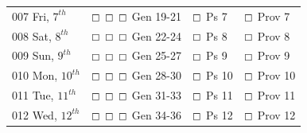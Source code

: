 \documentclass[10pt,landscape,twocolumn,letterpaper]{article}
\begin{document}
\begin{tabular}{p{0.8in}p{1.3in}p{1.2in}p{1.2in}}
\tiny 007 \normalsize Fri, $7^{th}$ & $\boxempty$ $\boxempty$ $\boxempty$ \hspace{.05in}  \textcolor[rgb]{1.00,0.00,0.00}{Gen 19-21} & $\boxempty$ \hspace{.05in} \textcolor[rgb]{0.00,1.00,0.00}{Ps 7} & $\boxempty$ \hspace{.05in} \textcolor[rgb]{0.00,0.00,1.00}{Prov 7}  \\

\tiny 008 \normalsize Sat, $8^{th}$ & $\boxempty$ $\boxempty$ $\boxempty$ \hspace{.05in}  \textcolor[rgb]{1.00,0.00,0.00}{Gen 22-24} & $\boxempty$ \hspace{.05in} \textcolor[rgb]{0.00,1.00,0.00}{Ps 8} & $\boxempty$ \hspace{.05in} \textcolor[rgb]{0.00,0.00,1.00}{Prov 8}  \\

\tiny 009 \normalsize Sun, $9^{th}$ & $\boxempty$ $\boxempty$ $\boxempty$ \hspace{.05in} \textcolor[rgb]{1.00,0.00,0.00}{Gen 25-27} & $\boxempty$ \hspace{.05in} \textcolor[rgb]{0.00,1.00,0.00}{Ps 9} & $\boxempty$ \hspace{.05in} \textcolor[rgb]{0.00,0.00,1.00}{Prov 9}  \\

\tiny 010 \normalsize Mon, $10^{th}$ & $\boxempty$ $\boxempty$ $\boxempty$ \hspace{.05in} \textcolor[rgb]{1.00,0.00,0.00}{Gen 28-30} & $\boxempty$ \hspace{.05in} \textcolor[rgb]{0.00,1.00,0.00}{Ps 10} & $\boxempty$ \hspace{.05in} \textcolor[rgb]{0.00,0.00,1.00}{Prov 10}  \\

\tiny 011 \normalsize Tue, $11^{th}$ & $\boxempty$ $\boxempty$ $\boxempty$ \hspace{.05in} \textcolor[rgb]{1.00,0.00,0.00}{Gen 31-33} & $\boxempty$ \hspace{.05in} \textcolor[rgb]{0.00,1.00,0.00}{Ps 11} & $\boxempty$ \hspace{.05in} \textcolor[rgb]{0.00,0.00,1.00}{Prov 11}  \\

\tiny 012 \normalsize Wed, $12^{th}$ &  $\boxempty$ $\boxempty$ $\boxempty$ \hspace{.05in} \textcolor[rgb]{1.00,0.00,0.00}{Gen 34-36} &  $\boxempty$ \hspace{.05in} \textcolor[rgb]{0.00,1.00,0.00}{Ps 12} &  $\boxempty$ \hspace{.05in} \textcolor[rgb]{0.00,0.00,1.00}{Prov 12}  \\


\end{tabular}
\end{document}

